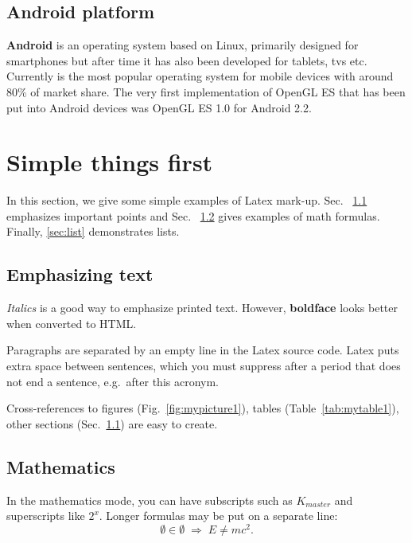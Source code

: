 \documentclass[a4paper,12pt]{article}
\begin{document}
\subsection{Android platform} %
\textbf{Android} \cite{androidcom} is an operating system based on Linux, primarily designed for smartphones but after time it has also been developed for tablets, tvs etc.
Currently is the most popular operating system for mobile devices with around 80\% of market share.
The very first implementation of OpenGL ES that has been put into Android devices was OpenGL ES 1.0 for Android 2.2.



\pagebreak[4]
\section{Simple things first}

In this section, we give some simple examples of Latex mark-up.
Sec. ~\ref{sec:emphasis} emphasizes important points and
Sec. ~\ref{sec:math} gives examples of math formulas.
Finally, \ref{sec:list} demonstrates lists.




\subsection{Emphasizing text}\label{sec:emphasis}

\textit{Italics} is a good way to emphasize printed text. However,
\textbf{boldface} looks better when converted to HTML.

Paragraphs are separated by an empty line in the Latex source code.
Latex puts extra space between sentences, which you must suppress
after a period that does not end a sentence, e.g.\ after this acronym.

Cross-references to figures (Fig.~\ref{fig:mypicture1}), tables
(Table~\ref{tab:mytable1}), other sections (Sec.~\ref{sec:emphasis})
are easy to create. 




\subsection{Mathematics}\label{sec:math}

In the mathematics mode, you can have subscripts such as $K_{master}$
and superscripts like $2^x$. Longer formulas may be put on a separate
line:
\[ \emptyset \in \emptyset \; \Rightarrow \; E \neq mc^2. \]
\end{document}
